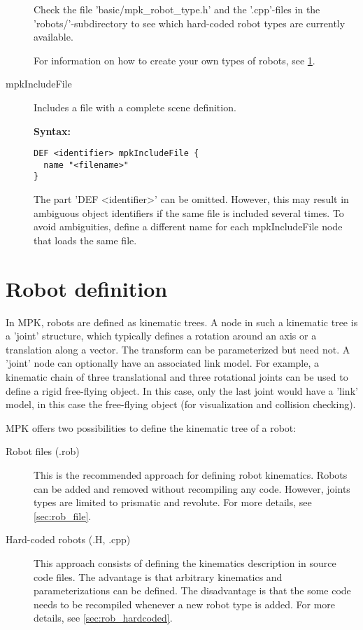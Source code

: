 \documentclass[letter,12pt]{article}
\begin{document}
\begin{description}
  Check the file 'basic/mpk\_robot\_type.h' and the '.cpp'-files in the
  'robots/'-subdirectory to see which hard-coded robot types are
  currently available.
  
  For information on how to create your own types of robots, see
  \ref{sec:robots}.


\item[mpkIncludeFile] Includes a file with a complete scene
  definition.

{\bf Syntax:}
\begin{verbatim}
DEF <identifier> mpkIncludeFile {
  name "<filename>"
}
\end{verbatim}

The part 'DEF <identifier>' can be omitted.  However, this may result
in ambiguous object identifiers if the same file is included several
times.  To avoid ambiguities, define a different name for each
mpkIncludeFile node that loads the same file.

\end{description}


\section{Robot definition}
\label{sec:robots}

In MPK, robots are defined as kinematic trees.  A node in such a
kinematic tree is a 'joint' structure, which typically defines a
rotation around an axis or a translation along a vector.  The
transform can be parameterized but need not.  A 'joint' node can
optionally have an associated link model.  For example, a kinematic
chain of three translational and three rotational joints can be used
to define a rigid free-flying object.  In this case, only the last
joint would have a 'link' model, in this case the free-flying object
(for visualization and collision checking).

MPK offers two possibilities to define the kinematic tree of a robot:

\begin{description}
  
\item[Robot files (.rob)] This is the recommended approach for
  defining robot kinematics.  Robots can be added and removed without
  recompiling any code.  However, joints types are limited to
  prismatic and revolute.  For more details, see \ref{sec:rob_file}.
  
\item[Hard-coded robots (.H, .cpp)] This approach consists of defining
  the kinematics description in source code files.  The advantage is
  that arbitrary kinematics and parameterizations can be defined.  The
  disadvantage is that the some code needs to be recompiled whenever a
  new robot type is added.  For more details, see
  \ref{sec:rob_hardcoded}.

\end{description}
\end{document}
